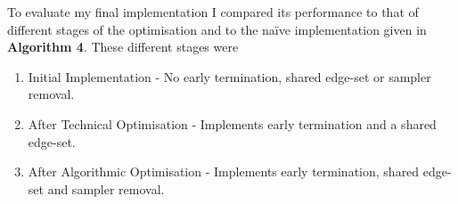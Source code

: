 \documentclass[11pt,twoside,a4paper]{report}
\begin{document}
To evaluate my final implementation I compared its performance to that of different stages of the optimisation and to the naïve implementation given in \textbf{Algorithm 4}. These different stages were
\begin{enumerate}[label=\roman*)]
	\item Initial Implementation - No early termination, shared edge-set or sampler removal. %
	\item After Technical Optimisation - Implements early termination and a shared edge-set. %
	\item After Algorithmic Optimisation - Implements early termination, shared edge-set and sampler removal. %
\end{enumerate}
\end{document}
